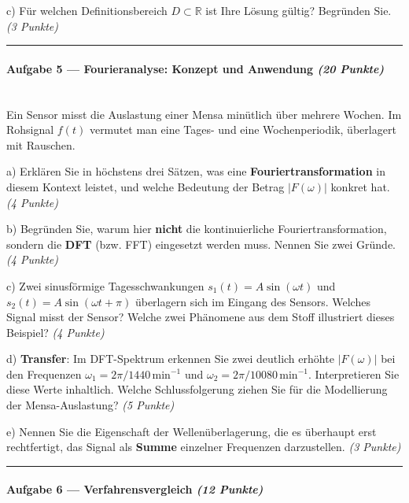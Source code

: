 \documentclass[11pt, a4paper]{article}
\begin{document}
c) Für welchen Definitionsbereich $D \subset \mathbb{R}$ ist Ihre Lösung gültig? Begründen Sie. \textit{(3 Punkte)}



\noindent\textcolor{rulegray}{\rule{\linewidth}{0.4pt}}


\paragraph{Aufgabe 5 — Fourieranalyse: Konzept und Anwendung \textit{(20 Punkte)}}\mbox{}\\[2pt]

Ein Sensor misst die Auslastung einer Mensa minütlich über mehrere Wochen. Im Rohsignal $f(t)$ vermutet man eine Tages- und eine Wochenperiodik, überlagert mit Rauschen.


a) Erklären Sie in höchstens drei Sätzen, was eine \textbf{Fouriertransformation} in diesem Kontext leistet, und welche Bedeutung der Betrag $|F(\omega)|$ konkret hat. \textit{(4 Punkte)}


b) Begründen Sie, warum hier \textbf{nicht} die kontinuierliche Fouriertransformation, sondern die \textbf{DFT} (bzw. FFT) eingesetzt werden muss. Nennen Sie zwei Gründe. \textit{(4 Punkte)}


c) Zwei sinusförmige Tagesschwankungen $s_1(t) = A\sin(\omega t)$ und $s_2(t) = A\sin(\omega t + \pi)$ überlagern sich im Eingang des Sensors. Welches Signal misst der Sensor? Welche zwei Phänomene aus dem Stoff illustriert dieses Beispiel? \textit{(4 Punkte)}


d) \textbf{Transfer}: Im DFT-Spektrum erkennen Sie zwei deutlich erhöhte $|F(\omega)|$ bei den Frequenzen $\omega_1 = 2\pi/1440\,\text{min}^{-1}$ und $\omega_2 = 2\pi/10080\,\text{min}^{-1}$. Interpretieren Sie diese Werte inhaltlich. Welche Schlussfolgerung ziehen Sie für die Modellierung der Mensa-Auslastung? \textit{(5 Punkte)}


e) Nennen Sie die Eigenschaft der Wellenüberlagerung, die es überhaupt erst rechtfertigt, das Signal als \textbf{Summe} einzelner Frequenzen darzustellen. \textit{(3 Punkte)}



\noindent\textcolor{rulegray}{\rule{\linewidth}{0.4pt}}


\paragraph{Aufgabe 6 — Verfahrensvergleich \textit{(12 Punkte)}}\mbox{}\\[2pt]
\end{document}
